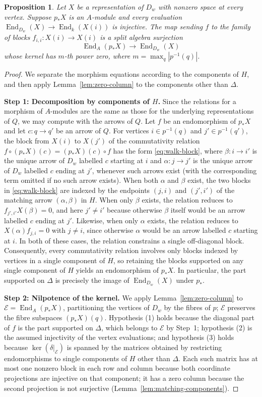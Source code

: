 \documentclass[a4paper,reqno,10pt]{amsart}
\newtheorem{proposition}[theorem]{Proposition}
\theoremstyle{definition}
\DeclareMathOperator{\End}{End}
\numberwithin{equation}{section}
\begin{document}
\begin{proposition}\label{prop:walk-end}
Let $X$ be a representation of $D_w$ with nonzero
space at every vertex. Suppose $p_*X$ is an $A$-module and every
evaluation $\End_{D_w}(X)\to\End_k(X(i))$ is injective.
The map sending $f$ to the family of blocks $f_{i,i}:X(i)\to X(i)$
is a split algebra surjection
\[
 \End_A(p_*X)\longrightarrow\End_{D_w}(X)
\]
whose kernel has $m$-th power zero, where $m=\max_q|p^{-1}(q)|$.
\end{proposition}
\begin{proof}
We separate the morphism equations according to the components of $H$, and then apply
Lemma~\ref{lem:zero-column} to the components other than $\Delta$.

\noindent\textbf{Step 1: Decomposition by components of $H$.}
Since the relations for a morphism of $A$-modules are the same as those for
the underlying representations of $Q$, we may compute with the arrows of
$Q$. Let $f$ be an endomorphism of $p_*X$ and let $c:q\to q'$ be an arrow of $Q$.
For vertices $i\in p^{-1}(q)$ and $j'\in p^{-1}(q')$, the block from
$X(i)$ to $X(j')$ of the commutativity relation
$f\circ(p_*X)(c)=(p_*X)(c)\circ f$ has the form \eqref{eq:walk-block},
where $\beta:i\to i'$ is the unique arrow of $D_w$ labelled $c$ starting at $i$
and $\alpha:j\to j'$ is the unique arrow of $D_w$ labelled $c$ ending at $j'$, whenever
such arrows exist (with the corresponding term omitted if no such arrow exists). When both $\alpha$ and $\beta$ exist, the two blocks in \eqref{eq:walk-block} are indexed by
the endpoints $(j,i)$ and $(j',i')$ of the matching arrow $(\alpha,\beta)$ in $H$. When only $\beta$
exists, the relation reduces to $f_{j',i'}X(\beta)=0$, and here $j'\ne i'$ because
otherwise $\beta$ itself would be an arrow labelled $c$ ending at $j'$.
Likewise, when only $\alpha$ exists, the relation reduces to
$X(\alpha)f_{j,i}=0$ with $j\ne i$, since otherwise $\alpha$ would be an
arrow labelled $c$ starting at $i$. In both of these cases, the relation constrains
a single off-diagonal block. Consequently, every commutativity
relation involves only blocks indexed by vertices in a single component of
$H$, so retaining the blocks supported on any single component of $H$ yields an endomorphism of $p_*X$. In particular, the part supported on $\Delta$
is precisely the image of $\End_{D_w}(X)$ under $p_*$.

\noindent\textbf{Step 2: Nilpotence of the kernel.}
We apply Lemma~\ref{lem:zero-column} to $\mathcal E=\End_A(p_*X)$, partitioning the
vertices of $D_w$ by the fibres of $p$; $\mathcal E$ preserves the fibre
subspaces $(p_*X)(q)$. Hypothesis (1) holds because the diagonal part
of $f$ is the part supported on $\Delta$, which belongs to $\mathcal E$ by Step~1;
hypothesis (2) is the assumed injectivity of the vertex
evaluations; and hypothesis (3) holds because $\ker(\delta|_{\mathcal E})$
is spanned by the matrices obtained by restricting endomorphisms to
single components of $H$ other than $\Delta$. Each such matrix has
at most one nonzero block in each row and column because both coordinate
projections are injective on that component; it has a zero column because
the second projection is not surjective (Lemma~\ref{lem:matching-components}).
\end{proof}
\end{document}
